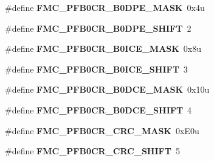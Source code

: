 \begin{DoxyCompactItemize}
\item 
\#define {\bfseries F\+M\+C\+\_\+\+P\+F\+B0\+C\+R\+\_\+\+B0\+D\+P\+E\+\_\+\+M\+A\+SK}~0x4u\hypertarget{group__FMC__Register__Masks_gaff35af9c8bc3c5cf2f6bf9dd76253a02}{}\label{group__FMC__Register__Masks_gaff35af9c8bc3c5cf2f6bf9dd76253a02}

\item 
\#define {\bfseries F\+M\+C\+\_\+\+P\+F\+B0\+C\+R\+\_\+\+B0\+D\+P\+E\+\_\+\+S\+H\+I\+FT}~2\hypertarget{group__FMC__Register__Masks_gabe5b35383e6d2198f45bc66429b0ce61}{}\label{group__FMC__Register__Masks_gabe5b35383e6d2198f45bc66429b0ce61}

\item 
\#define {\bfseries F\+M\+C\+\_\+\+P\+F\+B0\+C\+R\+\_\+\+B0\+I\+C\+E\+\_\+\+M\+A\+SK}~0x8u\hypertarget{group__FMC__Register__Masks_ga093ec774220ef7557784c2cea999502e}{}\label{group__FMC__Register__Masks_ga093ec774220ef7557784c2cea999502e}

\item 
\#define {\bfseries F\+M\+C\+\_\+\+P\+F\+B0\+C\+R\+\_\+\+B0\+I\+C\+E\+\_\+\+S\+H\+I\+FT}~3\hypertarget{group__FMC__Register__Masks_ga7595313d5ea6aa0ddb4fa755bad06110}{}\label{group__FMC__Register__Masks_ga7595313d5ea6aa0ddb4fa755bad06110}

\item 
\#define {\bfseries F\+M\+C\+\_\+\+P\+F\+B0\+C\+R\+\_\+\+B0\+D\+C\+E\+\_\+\+M\+A\+SK}~0x10u\hypertarget{group__FMC__Register__Masks_ga2ef77cab94225466d9301d03fc02b432}{}\label{group__FMC__Register__Masks_ga2ef77cab94225466d9301d03fc02b432}

\item 
\#define {\bfseries F\+M\+C\+\_\+\+P\+F\+B0\+C\+R\+\_\+\+B0\+D\+C\+E\+\_\+\+S\+H\+I\+FT}~4\hypertarget{group__FMC__Register__Masks_gaf25cde827cdccda0268d84a381fb8ab2}{}\label{group__FMC__Register__Masks_gaf25cde827cdccda0268d84a381fb8ab2}

\item 
\#define {\bfseries F\+M\+C\+\_\+\+P\+F\+B0\+C\+R\+\_\+\+C\+R\+C\+\_\+\+M\+A\+SK}~0x\+E0u\hypertarget{group__FMC__Register__Masks_ga2ba15c609c4ff7e43ed4d6119b704ddd}{}\label{group__FMC__Register__Masks_ga2ba15c609c4ff7e43ed4d6119b704ddd}

\item 
\#define {\bfseries F\+M\+C\+\_\+\+P\+F\+B0\+C\+R\+\_\+\+C\+R\+C\+\_\+\+S\+H\+I\+FT}~5\hypertarget{group__FMC__Register__Masks_ga45e4e9c3fff1241f2d1fffa05825efc8}{}\label{group__FMC__Register__Masks_ga45e4e9c3fff1241f2d1fffa05825efc8}


\end{DoxyCompactItemize}
